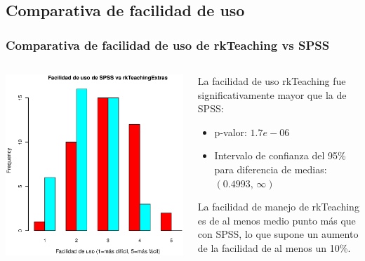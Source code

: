 \documentclass[mathserif,profesionalfont,10pt,dvips,xcolor=table]{beamer}
\theoremstyle{definition}
\begin{document}
\subsection{Comparativa de facilidad de uso}
\begin{frame}
\frametitle{Comparativa de facilidad de uso de rkTeaching vs SPSS}
\begin{columns}
\begin{column}{0.5\textwidth}
\begin{center}
\includegraphics[scale=0.35]{img/barras_facilidad}
\end{center}
\end{column}
\begin{column}{0.45\textwidth}
La facilidad de uso rkTeaching fue significativamente mayor que la de SPSS:
\begin{itemize}
\item p-valor: $1.7e-06 $
\item Intervalo de confianza del 95\% para diferencia de medias: $(0.4993,\, \infty)$
\end{itemize}
La facilidad de manejo de rkTeaching es de al menos medio punto más que con SPSS, lo que supone un aumento de la facilidad de al menos un 10\%. 
\end{column}
\end{columns}
\end{frame}
\end{document}

